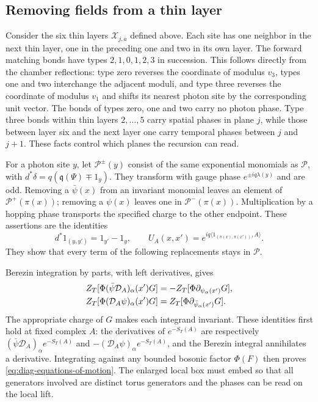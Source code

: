 \subsection{Removing fields from a thin layer}\label{subsec:diag-fermion-recursion}

Consider the six thin layers $\mathcal X_{j,a}$ defined above.
Each site has one neighbor in the next thin layer, one in the
preceding one and two in its own layer. The forward matching
bonds have types $2,1,0,1,2,3$ in succession. This follows
directly from the chamber reflections: type zero reverses
the coordinate of modulus $v_3$, types one and two interchange
the adjacent moduli, and type three reverses the coordinate of
modulus $v_1$ and shifts its nearest photon site by the corresponding
unit vector. The bonds of types zero, one and two carry no photon
phase. Type three bonds within thin layers $2,\ldots,5$ carry
spatial phases in plane $j$, while those between layer six and
the next layer one carry temporal phases between $j$ and $j+1$.
These facts control which planes the recursion can read.

For a photon site $y$, let $\mathcal P^\pm(y)$ consist of the
same exponential monomials as $\mathcal P$, with
$d^*\delta=q(\mathfrak q(\Psi)\mp1_y)$. They transform with
gauge phase $e^{\pm iq\lambda(y)}$ and are odd. Removing a
$\bar\psi(x)$ from an invariant monomial leaves an element of
$\mathcal P^+(\pi(x))$; removing a $\psi(x)$ leaves one in
$\mathcal P^-(\pi(x))$. Multiplication by a hopping phase transports
the specified charge to the other endpoint. These assertions
are the identities
\[
 d^*1_{(y,y')}=1_{y'}-1_y,\qquad
 U_A(x,x')=e^{iq\langle1_{(\pi(x),\pi(x'))},A\rangle}.
\]
They show that every term of the following replacements stays
in $\mathcal P$.

Berezin integration by parts, with left derivatives, gives
\begin{align}\label{eq:diag-equations-of-motion}
 Z_T[\Phi(\bar\psi \mathcal D_A)_\alpha(x')G]
       &=-Z_T[\Phi\partial_{\psi_\alpha(x')}G],\notag\\
 Z_T[\Phi(\mathcal D_A\psi)_\alpha(x')G]
       &= Z_T[\Phi\partial_{\bar\psi_\alpha(x')}G].
\end{align}
The appropriate charge of $G$ makes each integrand invariant.
These identities first hold at fixed complex $A$: the
derivatives of $e^{-S_T(A)}$ are respectively
$(\bar\psi \mathcal D_A)_\alpha e^{-S_T(A)}$ and
$-(\mathcal D_A\psi)_\alpha e^{-S_T(A)}$, and the Berezin integral
annihilates a derivative. Integrating against any bounded
bosonic factor $\Phi(F)$ then proves
\eqref{eq:diag-equations-of-motion}. The enlarged local box
must embed so that all generators involved are distinct torus
generators and the phases can be read on the local lift.

